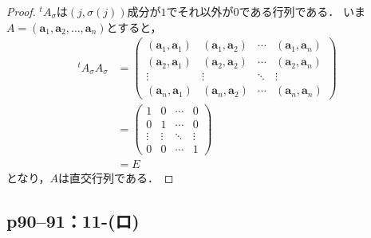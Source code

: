 \documentclass[a4paper,10pt,fleqn]{ltjsarticle}
\begin{document}
\begin{tleftbar}
    \begin{proof}
        ${}^t A_\sigma$は$(j,\sigma(j))$成分が$1$でそれ以外が$0$である行列である．
        いま$A = (\bm{a}_1,\bm{a}_2,\ldots,\bm{a}_n)$とすると，
        \begin{align*}
            {}^t A_\sigma A_\sigma & =
            \begin{pmatrix}
                (\bm{a}_1,\bm{a}_1) & (\bm{a}_1,\bm{a}_2) & \cdots & (\bm{a}_1,\bm{a}_n) \\
                (\bm{a}_2,\bm{a}_1) & (\bm{a}_2,\bm{a}_2) & \cdots & (\bm{a}_2,\bm{a}_n) \\
                \vdots              & \vdots              & \ddots & \vdots              \\
                (\bm{a}_n,\bm{a}_1) & (\bm{a}_n,\bm{a}_2) & \cdots & (\bm{a}_n,\bm{a}_n)
            \end{pmatrix}
            \\
                                   & = \begin{pmatrix} 1 & 0 & \cdots & 0 \\ 0 & 1 & \cdots & 0 \\ \vdots & \vdots & \ddots & \vdots \\ 0 & 0 & \cdots & 1 \end{pmatrix} \\
                                   & = E
        \end{align*}
        となり，$A$は直交行列である．
    \end{proof}
\end{tleftbar}

\subsection*{p90--91：11-(ロ)}
\end{document}
